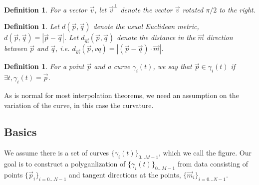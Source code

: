 \documentclass{article}
\newtheorem{definition}[cntr]{Definition}
\numberwithin{cntr}{section}
\numberwithin{equation}{section}
\newcommand{\abs}[1]{\left| #1 \right|}%
\newcommand{\vp}[0]{{\vec{p}}}
\newcommand{\vq}[0]{{\vec{q}}}
\newcommand{\vm}[0]{{\vec{m}}}
\newcommand{\vv}[0]{{\vec{v}}}
\newcommand{\Oto}[1]{{0 \ldots #1-1}}
\newcommand{\OtoN}{{0 \ldots N-1}}
\newcommand{\pointData}{{ \{ \vp_{i} \}_{i=\OtoN} }}
\newcommand{\tanData}{{ \{ \vm_{i} \}_{i=\OtoN} }}
\newcommand{\curveSet}{{ \{ \gamma_i(t) \}_{\Oto{M}}}}
\begin{document}
\begin{definition}
  \label{def:perp}
  For a vector $\vv$, let $\vv^{\perp}$ denote the vector $\vv$ rotated $\pi/2$ to the right.
\end{definition}

\begin{definition}
  \label{def:metric}
  Let $d(\vp,\vq)$ denote the usual Euclidean metric, $d(\vp,\vq) = \abs{\vp - \vq}$. Let $d_{\vm}(\vp,\vq)$ denote the distance in the $\vm$ direction between $\vp$ and $\vq$, i.e. $d_{\vm}(\vp,vq) = \abs{ (\vp - \vq) \cdot \vm}$.
\end{definition}

\begin{definition}
  For a point $\vp$ and a curve $\gamma_{i}(t)$, we say that $\vp \in \gamma_{i}(t)$ if $\exists t, \gamma_{i}(t)=\vp$.
\end{definition}

As is normal for most interpolation theorems, we need an assumption on the variation of the curve, in this case the curvature.

\subsection{Basics}

We assume there is a set of curves $\curveSet$, which we call the figure. Our goal is to construct a polyganlization of $\curveSet$ from data consisting of points $\pointData$ and tangent directions at the points, $\tanData$.
\end{document}
